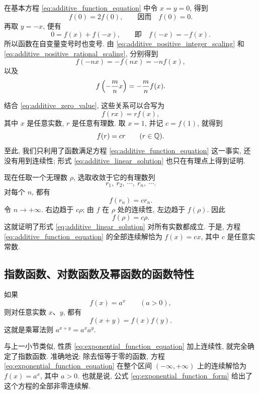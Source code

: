 在基本方程 \eqref{eq:additive_function_equation} 中令 $x=y=0$, 得到
\begin{equation}\label{eq:additive_zero_value}
f(0)=2f(0),\qquad\text{因而}\quad f(0)=0.
\end{equation}
再取 $y=-x$, 便有
$$
0=f(x)+f(-x),\qquad\text{即}\quad f(-x)=-f(x).
$$
所以函数在自变量变号时也变号.
由 \eqref{eq:additive_positive_integer_scaling} 和
\eqref{eq:additive_positive_rational_scaling}, 分别得到
\begin{equation}\label{eq:additive_negative_integer_scaling}
f(-nx)=-f(nx)=-nf(x),
\end{equation}
以及
\begin{equation}\label{eq:additive_negative_rational_scaling}
f\left( -\frac mn x \right)=-\frac mn f(x).
\end{equation}

结合 \eqref{eq:additive_zero_value}, 这些关系可以合写为
$$
f(rx)=rf(x),
$$
其中 $x$ 是任意实数, $r$ 是任意有理数.
取 $x=1$, 并记 $c=f(1)$, 就得到
$$
f(r)=cr\qquad(r\in\mathbb{Q}).
$$
至此, 我们只利用了函数满足方程 \eqref{eq:additive_function_equation} 这一事实,
还没有用到连续性; 形式 \eqref{eq:additive_linear_solution} 也只在有理点上得到证明.

现在任取一个无理数 $\rho$, 选取收敛于它的有理数列
$$
r_1,\ r_2,\ \cdots,\ r_n,\ \cdots.
$$
对每个 $n$, 都有
$$
f(r_n)=cr_n.
$$
令 $n\to+\infty$. 右边趋于 $c\rho$;
由 $f$ 在 $\rho$ 处的连续性, 左边趋于 $f(\rho)$.
因此
$$
f(\rho)=c\rho.
$$
这就证明了形式 \eqref{eq:additive_linear_solution} 对所有实数都成立.
于是, {\kaishu 方程 \eqref{eq:additive_function_equation} 的全部连续解恰为
$f(x)=cx$, 其中 $c$ 是任意实常数.}

\subsection{指数函数、对数函数及幂函数的函数特性}\label{subsec:75}
\myrefparagraph{1\textdegree}\label{ex:exponential_functional_characterization}
如果
\begin{equation}\label{eq:exponential_function_form}
f(x)=a^x\qquad(a>0),
\tag{b}
\end{equation}
则对任意实数 $x$、$y$, 都有
\begin{equation}\label{eq:exponential_function_equation}
f(x+y)=f(x)f(y).
\tag{B}
\end{equation}
这就是乘幂法则 $a^{x+y}=a^x a^y$.

与上一小节类似, 性质 \eqref{eq:exponential_function_equation} 加上连续性,
就完全确定了指数函数. 准确地说:
{\kaishu 除去恒等于零的函数, 方程 \eqref{eq:exponential_function_equation}
在整个区间 $(-\infty,+\infty)$ 上的连续解恰为
$f(x)=a^x$, 其中 $a>0$.}
也就是说, 公式 \eqref{eq:exponential_function_form} 给出了这个方程的全部非零连续解.

